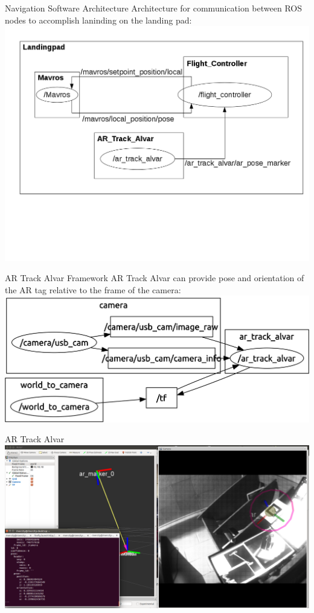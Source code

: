 \documentclass[11pt]{beamer}
\begin{document}
\begin{frame}{Navigation Software Architecture}
	Architecture for communication between ROS nodes to accomplish laninding on the landing pad: \\
	\centering
	\includegraphics[width=.9\textwidth]{images/navigation.png}
\end{frame}

\begin{frame}{AR Track Alvar Framework}
	AR Track Alvar can provide pose and orientation of the AR tag relative to the frame of the camera: \\
	\centering
	\includegraphics[width=1\textwidth]{images/artrackgraph.png}
\end{frame}

\begin{frame}{AR Track Alvar}
	\centering
	\includegraphics[width=1\textwidth]{images/alvar2.png}
\end{frame}
\end{document}
